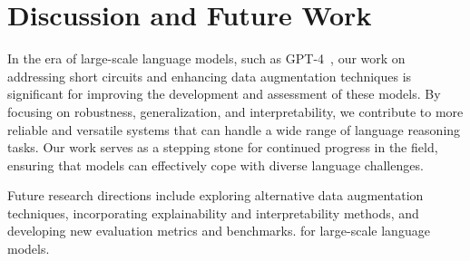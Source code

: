 \section{Discussion and Future Work}
\label{sec:discussion}
In the era of large-scale language models, such as GPT-4~\cite{openai2023gpt4}, 
our work on addressing short circuits and enhancing 
data augmentation techniques is significant for 
improving the development and assessment of these models. 
By focusing on robustness, generalization, and interpretability, 
we contribute to more reliable and versatile systems 
that can handle a wide range of language reasoning tasks. 
Our work serves as a stepping stone for continued progress in the field, 
ensuring that models can effectively cope with diverse language challenges.

Future research directions include exploring alternative 
data augmentation techniques, incorporating explainability and 
interpretability methods, and developing new evaluation metrics and benchmarks. 
for large-scale language models.
